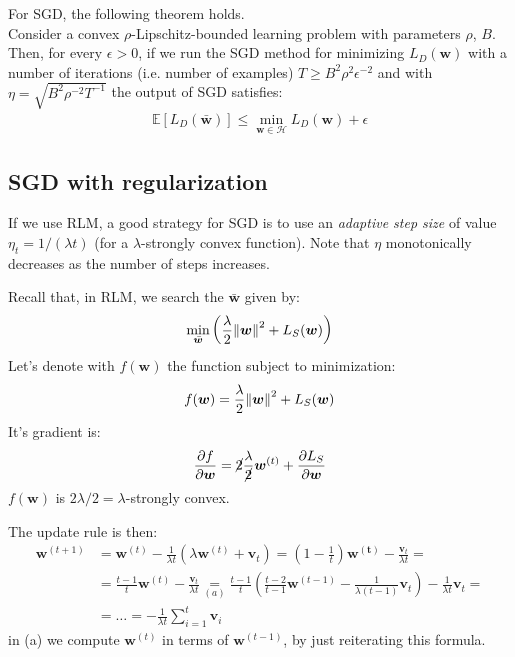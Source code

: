 \documentclass[../template.tex]{subfiles}
\begin{document}
For SGD, the following theorem holds.\\
Consider a convex $\rho$-Lipschitz-bounded learning problem with parameters $\rho$, $B$. Then, for every $\epsilon > 0$, if we run the SGD method for minimizing $L_D(\bm{w})$ with a number of iterations (i.e. number of examples) $T \geq B^2 \rho^2 \epsilon^{-2}$ and with $\eta = \sqrt{B^2 \rho^{-2} T^{-1}}$ the output of SGD satisfies:
\begin{align*}
    \mathbb{E}[L_D(\bar{\bm{w}})] \leq \min_{\bm{w} \in \mathcal{H}} L_D(\bm{w}) + \epsilon
\end{align*}        

\subsection{SGD with regularization}
If we use RLM, a good strategy for SGD is to use an \textit{adaptive step size} of value $\eta_t = 1/(\lambda t)$ (for a $\lambda$-strongly convex function). Note that $\eta$ monotonically decreases as the number of steps increases.

Recall that, in RLM, we search the $\bar{\bm{w}}$ given by:
\begin{align*}
    \min_{\bar{\bm{w}}} \left(\frac{\lambda}{2} \norm{\bm{w}}^2 + L_S(\bm{w}) \right)
\end{align*} 
Let's denote with $f(\bm{w})$ the function subject to minimization:
\begin{align*}
    f(\bm{w}) = \frac{\lambda}{2} \norm{\bm{w}}^2 + L_S(\bm{w})
\end{align*} 
It's gradient is:
\begin{align*}
    \frac{\partial f}{\partial \bm{w}} = \cancel{2}\frac{\lambda}{\cancel{2}} \bm{w}^{(t)} + \frac{\partial L_S}{\partial \bm{w}}   
\end{align*}
$f(\bm{w})$ is $2 \lambda/2 = \lambda$-strongly convex. 

The update rule is then:
\begin{align*}
    \bm{w}^{(t+1)} &= \bm{w}^{(t)} - \frac{1}{\lambda t} \left(\lambda \bm{w}^{(t)} + \bm{v}_t\right) = \left(1-\frac{1}{t} \right)\bm{w^{(t)}} - \frac{\bm{v}_t}{\lambda t} =\\
    &= \frac{t-1}{t} \bm{w}^{(t)} -\frac{\bm{v}_t}{\lambda t} \underset{(a)}{=}  \frac{t-1}{t}   \left(\frac{t-2}{t-1} \bm{w}^{(t-1)} - \frac{1}{\lambda (t-1)}\bm{v}_t  \right) - \frac{1}{\lambda t} \bm{v}_t =\\
    &= \dots = -\frac{1}{\lambda t} \sum_{i=1}^t \bm{v}_i  
\end{align*}
in (a) we compute $\bm{w}^{(t)}$ in terms of $\bm{w}^{(t-1)}$, by just reiterating this formula.
\end{document}
